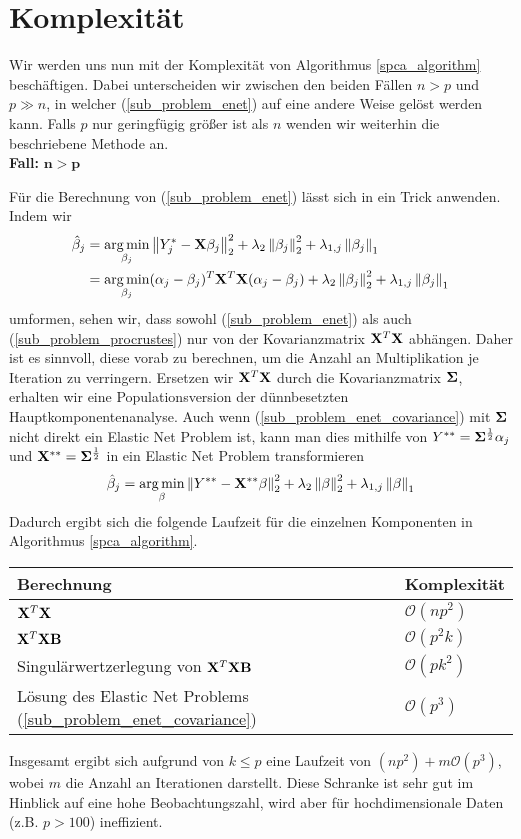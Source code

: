 \section{Komplexität}
\label{complexity}

Wir werden uns nun mit der Komplexität von Algorithmus \ref{spca_algorithm} beschäftigen. Dabei unterscheiden wir zwischen den beiden Fällen $n > p$ und $p \gg n$, in welcher (\ref{sub_problem_enet}) auf eine andere Weise gelöst werden kann. Falls $p$ nur geringfügig größer ist als $n$ wenden wir weiterhin die beschriebene Methode an.\\

\textbf{Fall: } $\mathbf{n > p}$

Für die Berechnung von (\ref{sub_problem_enet}) lässt sich in ein Trick anwenden. Indem wir
\begin{align}
\label{sub_problem_enet_covariance}
\hat{\beta}_j & = \operatorname*{arg\,min}_{\beta_j} \left\lVert Y_j^* - \mathbf{X} \beta_j \right\rVert_2^2 + \lambda_2 \left\lVert \beta_j \right\rVert_2^2 + \lambda_{1,j}\left\lVert \beta_j \right\rVert_1 \nonumber\\
& = \operatorname*{arg\,min}_{\beta_j} (\alpha_j - \beta_j)^T \mathbf{X}^T \mathbf{X} (\alpha_j - \beta_j) + \lambda_2 \left\lVert \beta_j \right\rVert_2^2 + \lambda_{1,j}\left\lVert \beta_j \right\rVert_1
\end{align}
umformen, sehen wir, dass sowohl (\ref{sub_problem_enet}) als auch (\ref{sub_problem_procrustes}) nur von der Kovarianzmatrix $\mathbf{X}^T \mathbf{X}$ abhängen. Daher ist es sinnvoll, diese vorab zu berechnen, um die Anzahl an Multiplikation je Iteration zu verringern. Ersetzen wir $\mathbf{X}^T\mathbf{X}$ durch die Kovarianzmatrix $\mathbf{\Sigma}$, erhalten wir eine Populationsversion der dünnbesetzten Hauptkomponentenanalyse. Auch wenn (\ref{sub_problem_enet_covariance}) mit $\mathbf{\Sigma}$ nicht direkt ein Elastic Net Problem ist, kann man dies mithilfe von $Y^{**} = \mathbf{\Sigma}^{\frac{1}{2}} \alpha_j$ und $\mathbf{X}^{**} = \mathbf{\Sigma}^{\frac{1}{2}}$ in ein Elastic Net Problem transformieren
$$\hat{\beta}_j = \operatorname*{arg\,min}_{\beta} \left\lVert Y^{**} - \mathbf{X}^{**} \beta \right\rVert_2^2 + \lambda_2 \left\lVert \beta \right\rVert_2^2 + \lambda_{1,j}\left\lVert \beta \right\rVert_1$$
Dadurch ergibt sich die folgende Laufzeit für die einzelnen Komponenten in Algorithmus \ref{spca_algorithm}.

\begin{table}
\centering
\begin{tabular}{ll}
Berechnung & Komplexität\\\hline\hspace{0.2cm}
$\mathbf{X}^T\mathbf{X}$ & $\mathcal{O}(np^2)$\\
$\mathbf{X}^T\mathbf{X} \mathbf{B}$ & $\mathcal{O}(p^2k)$\\
Singulärwertzerlegung von $\mathbf{X}^T\mathbf{X} \mathbf{B}$ & $\mathcal{O}(pk^2)$\\
Lösung des Elastic Net Problems (\ref{sub_problem_enet_covariance}) & $\mathcal{O}(p^3)$
\end{tabular}
\end{table}
Insgesamt ergibt sich aufgrund von $k \leq p$ eine Laufzeit von $(np^2) + m\mathcal{O}(p^3)$, wobei $m$ die Anzahl an Iterationen darstellt. Diese Schranke ist sehr gut im Hinblick auf eine hohe Beobachtungszahl, wird aber für hochdimensionale Daten (z.B. $p > 100$) ineffizient.\\

